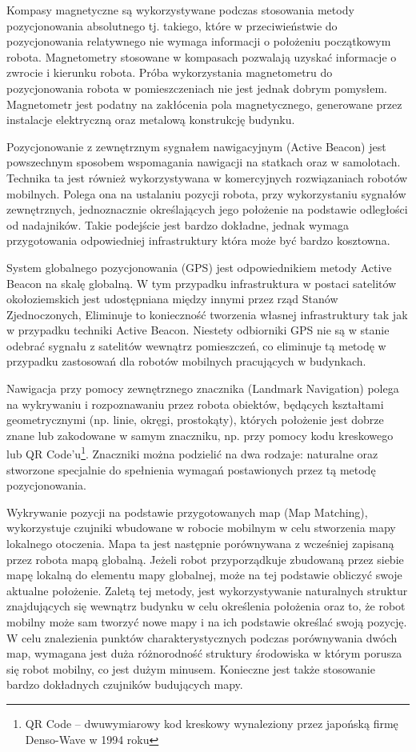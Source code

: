 Kompasy magnetyczne są wykorzystywane podczas stosowania metody pozycjonowania absolutnego tj. takiego, które w przeciwieństwie do pozycjonowania relatywnego nie wymaga informacji o położeniu początkowym robota. Magnetometry stosowane w kompasach pozwalają uzyskać informacje o zwrocie i kierunku robota. Próba wykorzystania magnetometru do pozycjonowania robota w pomieszczeniach nie jest jednak dobrym pomysłem. Magnetometr jest podatny na zakłócenia pola magnetycznego, generowane przez instalacje elektryczną oraz metalową konstrukcję budynku.

Pozycjonowanie z zewnętrznym sygnałem nawigacyjnym (Active Beacon) jest powszechnym sposobem wspomagania nawigacji na statkach oraz w samolotach. Technika ta jest również wykorzystywana w komercyjnych rozwiązaniach robotów mobilnych. Polega ona na ustalaniu pozycji robota, przy wykorzystaniu sygnałów zewnętrznych, jednoznacznie określających jego położenie na podstawie odległości od nadajników. Takie podejście jest bardzo dokładne, jednak wymaga przygotowania odpowiedniej infrastruktury która może być bardzo kosztowna.

System globalnego pozycjonowania (GPS) jest odpowiednikiem metody Active Beacon na skalę globalną. W tym przypadku infrastruktura w postaci satelitów okołoziemskich jest udostępniana między innymi przez rząd Stanów Zjednoczonych, Eliminuje to konieczność tworzenia własnej infrastruktury tak jak w przypadku techniki Active Beacon. Niestety odbiorniki GPS nie są w stanie odebrać sygnału z satelitów wewnątrz pomieszczeń, co eliminuje tą metodę w przypadku zastosowań dla robotów mobilnych pracujących w budynkach.

Nawigacja przy pomocy zewnętrznego znacznika (Landmark Navigation) polega na wykrywaniu i rozpoznawaniu przez robota obiektów, będących kształtami geometrycznymi (np. linie, okręgi, prostokąty), których położenie jest dobrze znane lub zakodowane w samym znaczniku, np. przy pomocy kodu kreskowego lub QR Code'u\footnote{QR Code -- dwuwymiarowy kod kreskowy wynaleziony przez japońską firmę Denso-Wave w 1994 roku}. Znaczniki można podzielić na dwa rodzaje: naturalne oraz stworzone specjalnie do spełnienia wymagań postawionych przez tą metodę pozycjonowania.

Wykrywanie pozycji na podstawie przygotowanych map (Map Matching), wykorzystuje czujniki wbudowane w robocie mobilnym w celu stworzenia mapy lokalnego otoczenia. Mapa ta jest następnie porównywana z wcześniej zapisaną przez robota mapą globalną. Jeżeli robot przyporządkuje zbudowaną przez siebie mapę lokalną do elementu mapy globalnej, może na tej podstawie obliczyć swoje aktualne położenie. Zaletą tej metody, jest wykorzystywanie naturalnych struktur znajdujących się wewnątrz budynku w celu określenia położenia oraz to, że robot mobilny może sam tworzyć nowe mapy i na ich podstawie określać swoją pozycję. W celu znalezienia punktów charakterystycznych podczas porównywania dwóch map, wymagana jest duża różnorodność struktury środowiska w którym porusza się robot mobilny, co jest dużym minusem. Konieczne jest także stosowanie bardzo dokładnych czujników budujących mapy.

